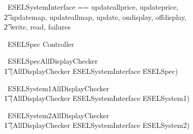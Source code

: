 \begin{circus}
   \circchannelset\ ESELSystemInterface == \lchanset updateallprice, updateprice, \\
    \t2 updatemap, updateallmap, update, ondisplay, offdisplay, \\
    \t2 write, read, failures \rchanset \\
\end{circus}

\begin{circus}
    \circprocess\ ESELSpec \circdef  Controller
\end{circus}



\begin{circus}
    \circprocess\ ESELSpecAllDisplayChecker \circdef \\
        \t1 (AllDisplayChecker \lpar ESELSystemInterface \rpar ESELSpec) \\
\end{circus}



\begin{circus}
    \circprocess\ ESELSystem1AllDisplayChecker \circdef \\
        \t1 (AllDisplayChecker \lpar ESELSystemInterface \rpar ESELSystem1) \\
\end{circus}



\begin{circus}
    \circprocess\ ESELSystem2AllDisplayChecker \circdef \\
        \t1 (AllDisplayChecker \lpar ESELSystemInterface \rpar ESELSystem2) \\
\end{circus}
